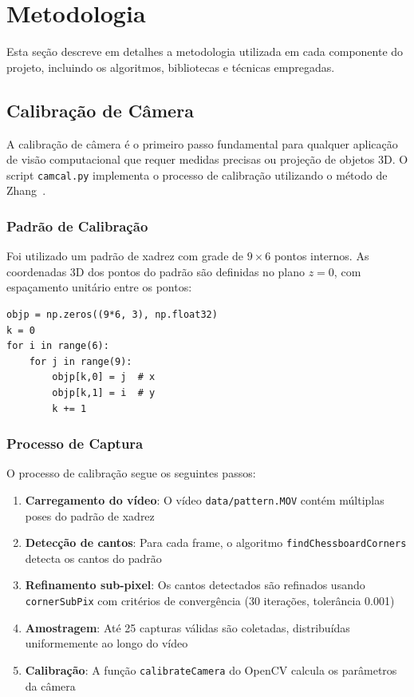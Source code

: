 \section{Metodologia}
\label{sec:metodologia}

Esta seção descreve em detalhes a metodologia utilizada em cada componente do projeto, incluindo os algoritmos, bibliotecas e técnicas empregadas.

\subsection{Calibração de Câmera}

A calibração de câmera é o primeiro passo fundamental para qualquer aplicação de visão computacional que requer medidas precisas ou projeção de objetos 3D. O script \texttt{camcal.py} implementa o processo de calibração utilizando o método de Zhang~\cite{zhang2000}.

\subsubsection{Padrão de Calibração}

Foi utilizado um padrão de xadrez com grade de $9 \times 6$ pontos internos. As coordenadas 3D dos pontos do padrão são definidas no plano $z=0$, com espaçamento unitário entre os pontos:

\begin{lstlisting}[caption=Definição das coordenadas do padrão de xadrez]
objp = np.zeros((9*6, 3), np.float32)
k = 0
for i in range(6):
    for j in range(9):
        objp[k,0] = j  # x
        objp[k,1] = i  # y
        k += 1
\end{lstlisting}

\subsubsection{Processo de Captura}

O processo de calibração segue os seguintes passos:

\begin{enumerate}
    \item \textbf{Carregamento do vídeo}: O vídeo \texttt{data/pattern.MOV} contém múltiplas poses do padrão de xadrez
    \item \textbf{Detecção de cantos}: Para cada frame, o algoritmo \texttt{findChessboardCorners} detecta os cantos do padrão
    \item \textbf{Refinamento sub-pixel}: Os cantos detectados são refinados usando \texttt{cornerSubPix} com critérios de convergência (30 iterações, tolerância 0.001)
    \item \textbf{Amostragem}: Até 25 capturas válidas são coletadas, distribuídas uniformemente ao longo do vídeo
    \item \textbf{Calibração}: A função \texttt{calibrateCamera} do OpenCV calcula os parâmetros da câmera
\end{enumerate}

